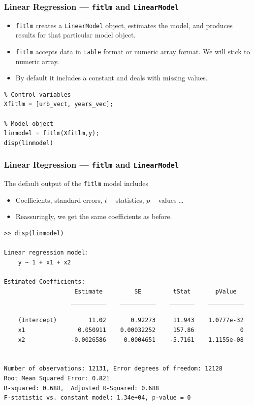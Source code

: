 \documentclass[11pt,xcolor={svgnames},aspectratio=169,usepdftitle=false,notheorems]{beamer}
\begin{document}
\begin{frame}[fragile]
  \frametitle{Linear Regression --- \texttt{fitlm} and \texttt{LinearModel}}
\begin{itemize}
  \item \texttt{fitlm} creates a \texttt{LinearModel} object, estimates the model, and produces results for that particular model object.
  \item \texttt{fitlm} accepts data in \verb;table; format or numeric array format. We will stick to numeric array.
  \item By default it includes a constant and deals with missing values.
\end{itemize}
\begin{lstlisting}
% Control variables
Xfitlm = [urb_vect, years_vec];

% Model object
linmodel = fitlm(Xfitlm,y);
disp(linmodel)
\end{lstlisting}
\end{frame}

\begin{frame}[fragile]
  \frametitle{Linear Regression --- \texttt{fitlm} and \texttt{LinearModel}}
  The default output of the \verb;fitlm; model includes
\begin{itemize}
  \item Coefficients, standard errors, $t-$statistics, $p-$values \ldots
  \item Reassuringly, we get the same coefficients as before.
\end{itemize}
\begin{lstlisting}[basicstyle=\tiny\ttfamily]
>> disp(linmodel)

Linear regression model:
    y ~ 1 + x1 + x2

Estimated Coefficients:
                    Estimate         SE         tStat       pValue  
                   __________    __________    _______    __________

    (Intercept)         11.02       0.92273     11.943    1.0777e-32
    x1               0.050911    0.00032252     157.86             0
    x2             -0.0026586     0.0004651    -5.7161    1.1155e-08


Number of observations: 12131, Error degrees of freedom: 12128
Root Mean Squared Error: 0.821
R-squared: 0.688,  Adjusted R-Squared: 0.688
F-statistic vs. constant model: 1.34e+04, p-value = 0
\end{lstlisting}
\end{frame}
\end{document}

